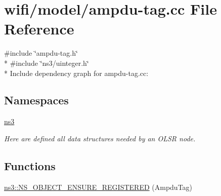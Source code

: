 \hypertarget{ampdu-tag_8cc}{}\section{wifi/model/ampdu-\/tag.cc File Reference}
\label{ampdu-tag_8cc}
{\ttfamily \#include \char`\"{}ampdu-\/tag.\+h\char`\"{}}\\*
{\ttfamily \#include \char`\"{}ns3/uinteger.\+h\char`\"{}}\\*
Include dependency graph for ampdu-\/tag.cc\+:
\subsection*{Namespaces}
\begin{DoxyCompactItemize}
\item 
 \hyperlink{namespacens3}{ns3}
\begin{DoxyCompactList}\small\item\em Here are defined all data structures needed by an O\+L\+SR node. \end{DoxyCompactList}\end{DoxyCompactItemize}
\subsection*{Functions}
\begin{DoxyCompactItemize}
\item 
\hyperlink{namespacens3_a1cb1e5e886d8d92aa2b845f7d083dba5}{ns3\+::\+N\+S\+\_\+\+O\+B\+J\+E\+C\+T\+\_\+\+E\+N\+S\+U\+R\+E\+\_\+\+R\+E\+G\+I\+S\+T\+E\+R\+ED} (Ampdu\+Tag)
\end{DoxyCompactItemize}
